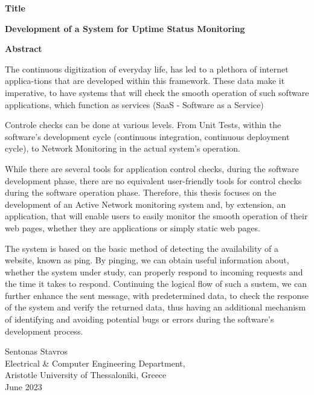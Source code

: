 {\selectfont

{}


\begin{center}
  \centering
  \textbf{\Large{Title}}
  \vspace{0.5cm}

  \textbf{\large{Development of a System for Uptime Status Monitoring}}
  \vspace{1cm}

  \centering
  \textbf{Abstract}
\end{center}

The continuous digitization of everyday life, has led to a plethora of internet applica\hyp{}tions
that are developed within this framework. These data make it imperative, to have systems
that will check the smooth operation of such software applications, which function
as services (SaaS - Software as a Service)

Controle checks can be done at various levels. From Unit Tests, within the software's development
cycle (continuous integration, continuous deployment cycle), to Network Monitoring in the actual
system's operation.  

While there are several tools for application control checks, during the software development
phase, there are no equivalent user-friendly tools for control checks during the software operation
phase. Therefore, this thesis focuses on the development of an Active Network monitoring system and, by extension,
an application, that will enable users to easily monitor the smooth operation of
their web pages, whether they are applications or simply static web pages. 

The system is based on the basic method of detecting the availability of a website,
known as ping. By pinging, we can obtain useful information about, whether the system under study,
can properly respond to incoming requests and the time it takes  to respond. Continuing 
the logical flow of such a sustem, we can further enhance the sent message, with predetermined
data, to check the response of the system and verify the returned data, thus having an additional mechanism
of identifying and avoiding potential bugs or errors during the software's development process.

\begin{flushright}
  \vspace{2cm}
  Sentonas Stavros
  \\
  Electrical \& Computer Engineering Department,
  \\
  Aristotle University of Thessaloniki, Greece
  \\
  June 2023
\end{flushright}

}
